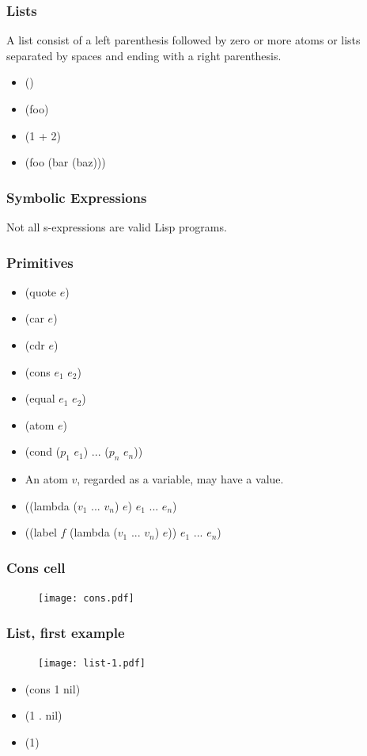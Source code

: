 \documentclass[16pt]{beamer}
\begin{document}
\begin{frame}
  \frametitle{Lists}
  \begin{block}{}
    A list consist of a left parenthesis followed by zero or more
    atoms or lists separated by spaces and ending with a right
    parenthesis.
  \end{block}
  \begin{itemize}
  \item ()
  \item (foo)
  \item (1 + 2)
  \item (foo (bar (baz)))
  \end{itemize}
\end{frame}

\begin{frame}
  \frametitle{Symbolic Expressions}
  \begin{block}{}
    Not all s-expressions are valid Lisp programs.
  \end{block}
\end{frame}

\begin{frame}
  \frametitle{Primitives}
  \begin{itemize}
  \item (quote $e$)
  \item (car $e$)
  \item (cdr $e$)
  \item (cons $e_1$ $e_2$)
  \item (equal $e_1$ $e_2$)
  \item (atom $e$)
  \item (cond ($p_1$ $e_1$) ... ($p_n$ $e_n$))
  \item An atom $v$, regarded as a variable, may have a value.
  \item ((lambda ($v_1$ ... $v_n$) $e$) $e_1$ ... $e_n$)
  \item ((label $f$ (lambda ($v_1$ ... $v_n$) $e$)) $e_1$ ... $e_n$)
  \end{itemize}
\end{frame}

\begin{frame}
  \frametitle{Cons cell}
  \begin{figure}
    \texttt{[image: cons.pdf]}
  \end{figure}
\end{frame}

\begin{frame}
  \frametitle{List, first example}
  \begin{figure}
    \texttt{[image: list-1.pdf]}
  \end{figure}
  \begin{itemize}
  \item (cons 1 nil)
  \item (1 . nil)
  \item (1)
  \end{itemize}
\end{frame}
\end{document}
